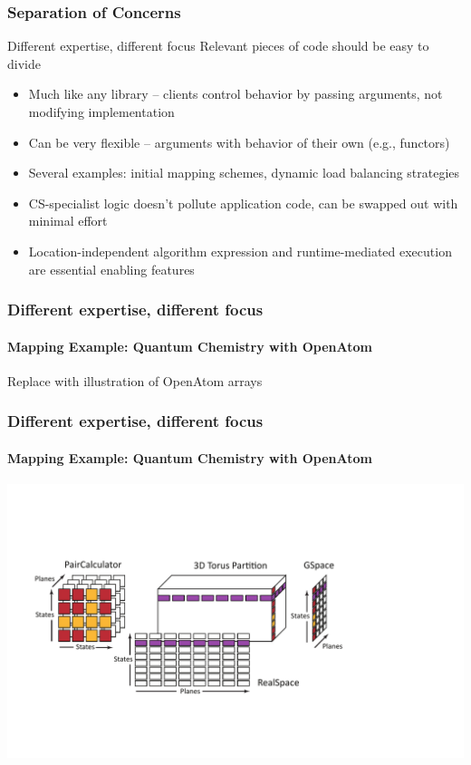 \begin{frame}
\frametitle{Separation of Concerns}
\begin{block}{Different expertise, different focus}
Relevant pieces of code should be easy to divide
\end{block}
\begin{itemize}
\item Much like any library -- clients control behavior by passing
  arguments, not modifying implementation
\item Can be very flexible -- arguments with behavior of their own
  (e.g., functors)
\item Several examples: initial mapping schemes, dynamic load
  balancing strategies
\item CS-specialist logic doesn't pollute application code, can be
  swapped out with minimal effort
\item Location-independent algorithm expression and runtime-mediated
  execution are essential enabling features
\end{itemize}
\end{frame}


\begin{frame}
\frametitle{Different expertise, different focus}
\framesubtitle{Mapping Example: Quantum Chemistry with {\sc OpenAtom}}
Replace with illustration of OpenAtom arrays
\end{frame}

\begin{frame}
\frametitle{Different expertise, different focus}
\framesubtitle{Mapping Example: Quantum Chemistry with {\sc OpenAtom}}
\includegraphics[width=0.9\textheight]{../figures/openatom/mapping.pdf}
\end{frame}


